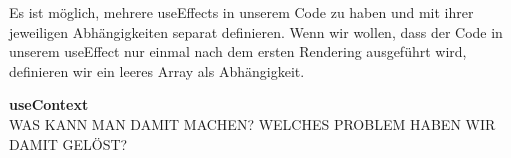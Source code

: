 Es ist möglich, mehrere useEffects in unserem Code zu haben und mit ihrer jeweiligen Abhängigkeiten separat definieren.
Wenn wir wollen, dass der Code in unserem useEffect nur einmal nach dem ersten Rendering ausgeführt wird, definieren wir ein leeres Array als Abhängigkeit.

\textbf{useContext} \\
WAS KANN MAN DAMIT MACHEN?
WELCHES PROBLEM HABEN WIR DAMIT GELÖST?




